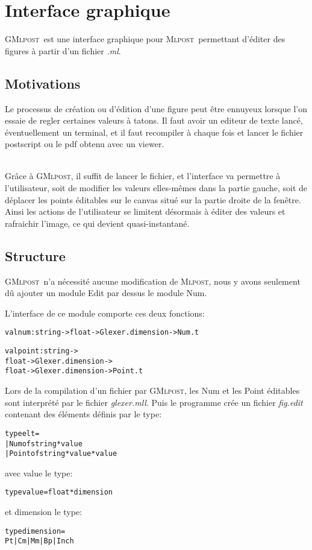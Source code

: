 \documentclass[a4paper,12pt]{article}
\newcommand{\mlpost}{\textsc{Mlpost}}
\newcommand{\gmlpost}{\textsc{GMlpost}}
\begin{document}
\section{Interface graphique}
\gmlpost\ est une interface graphique pour \mlpost\ permettant d'éditer des figures à partir d'un fichier \textit{.ml}. 
\subsection{Motivations}
Le processus de création ou d'édition d'une figure peut être ennuyeux lorsque l'on essaie de regler certaines valeurs à tatons. Il faut avoir un editeur de texte lancé, éventuellement un terminal, et il faut recompiler à chaque fois et lancer le fichier postscript ou le pdf obtenu avec un viewer.

~\\Grâce à \gmlpost, il suffit de lancer le fichier, et l'interface va permettre à l'utilisateur, soit de modifier les valeurs elles-mêmes dans la partie gauche, soit de déplacer les points éditables sur le canvas situé sur la partie droite de la fenêtre.
~\\Ainsi les actions de l'utilisateur se limitent désormais à éditer des valeurs et rafraichir l'image, ce qui devient quasi-instantané.
\subsection{Structure}
\gmlpost\ n'a nécessité aucune modification de \mlpost, nous y avons seulement dû ajouter un module Edit par dessus le module Num.

L'interface de ce module comporte ces deux fonctions:
\begin{alltt}
  val num: string -> float -> Glexer.dimension -> Num.t

  val point: string -> 
  float -> Glexer.dimension -> 
  float -> Glexer.dimension -> Point.t
\end{alltt}

Lors de la compilation d'un fichier par \gmlpost, les Num et les Point éditables sont interprété par le fichier \textit{glexer.mll}. Puis le programme crée un fichier \textit{fig.edit} contenant des éléments définis par le type:
\begin{alltt}
  type elt = 
  | Num of string * value
  | Point of string * value * value
\end{alltt}
avec value le type:
\begin{alltt}
  type value = float * dimension
\end{alltt}
et dimension le type:
\begin{alltt}
  type dimension =
  Pt | Cm | Mm | Bp | Inch
\end{alltt}
\end{document}
